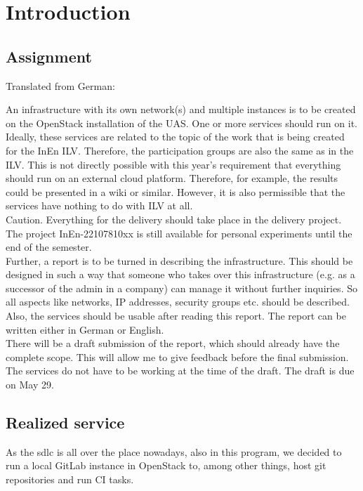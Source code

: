 \chapter{Introduction}

\section{Assignment}
Translated from German:

An infrastructure with its own network(s) and multiple instances is to be created on the OpenStack installation of the UAS.
One or more services should run on it.
Ideally, these services are related to the topic of the work that is being created for the InEn ILV.
Therefore, the participation groups are also the same as in the ILV.
This is not directly possible with this year's requirement that everything should run on an external cloud platform.
Therefore, for example, the results could be presented in a wiki or similar.
However, it is also permissible that the services have nothing to do with ILV at all.\\

Caution. Everything for the delivery should take place in the delivery project.
The project InEn-22107810xx is still available for personal experiments until the end of the semester.\\

Further, a report is to be turned in describing the infrastructure.
This should be designed in such a way that someone who takes over this infrastructure (e.g. as a successor of the admin in a company) can manage it without further inquiries.
So all aspects like networks, IP addresses, security groups etc. should be described.
Also, the services should be usable after reading this report.
The report can be written either in German or English.\\

There will be a draft submission of the report, which should already have the complete scope.
This will allow me to give feedback before the final submission.
The services do not have to be working at the time of the draft.
The draft is due on May 29.

\section{Realized service}
As the \ac{sdlc} is all over the place nowadays, also in this program, we decided to run a local GitLab instance in OpenStack to, among other things, host git repositories and run CI tasks.
